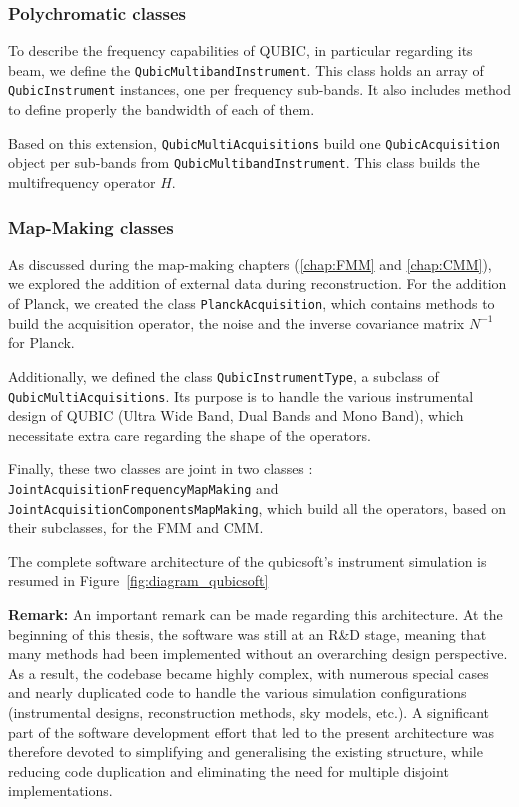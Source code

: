 \documentclass[../../thesis.tex]{subfiles}
\begin{document}
\subsubsection{Polychromatic classes}

To describe the frequency capabilities of QUBIC, in particular regarding its beam, we define the \texttt{QubicMultibandInstrument}. This class holds an array of \texttt{QubicInstrument} instances, one per frequency sub-bands. It also includes method to define properly the bandwidth of each of them. 

Based on this extension, \texttt{QubicMultiAcquisitions} build one \texttt{QubicAcquisition} object per sub-bands from \texttt{QubicMultibandInstrument}. This class builds the multifrequency operator $H$.

\subsubsection{Map-Making classes}

As discussed during the map-making chapters (\ref{chap:FMM} and \ref{chap:CMM}), we explored the addition of external data during reconstruction. For the addition of Planck, we created the class \texttt{PlanckAcquisition}, which contains methods to build the acquisition operator, the noise and the inverse covariance matrix $N^{-1}$ for Planck. 

Additionally, we defined the class \texttt{QubicInstrumentType}, a subclass of \texttt{QubicMultiAcquisitions}. Its purpose is to handle the various instrumental design of QUBIC (Ultra Wide Band, Dual Bands and Mono Band), which necessitate extra care regarding the shape of the operators.

Finally, these two classes are joint in two classes : \texttt{JointAcquisitionFrequencyMapMaking} and \texttt{JointAcquisitionComponentsMapMaking}, which build all the operators, based on their subclasses, for the FMM and CMM.

The complete software architecture of the qubicsoft's instrument simulation is resumed in Figure~\ref{fig:diagram_qubicsoft}

\vspace{10pt}

\textbf{Remark:} An important remark can be made regarding this architecture. At the beginning of this thesis, the software was still at an R\&D stage, meaning that many methods had been implemented without an overarching design perspective. As a result, the codebase became highly complex, with numerous special cases and nearly duplicated code to handle the various simulation configurations (instrumental designs, reconstruction methods, sky models, etc.).
A significant part of the software development effort that led to the present architecture was therefore devoted to simplifying and generalising the existing structure, while reducing code duplication and eliminating the need for multiple disjoint implementations.
\end{document}
